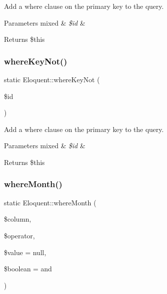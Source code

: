 Add a where clause on the primary key to the query.


\begin{DoxyParams}[1]{Parameters}
mixed & {\em \$id} & \\
\hline
\end{DoxyParams}
\begin{DoxyReturn}{Returns}
\$this 
\end{DoxyReturn}
\mbox{\label{class_eloquent_aa270e04797f3bcd3e062ddbcbb9df59a}} 
\subsubsection{\texorpdfstring{where\+Key\+Not()}{whereKeyNot()}}
{\footnotesize\ttfamily static Eloquent\+::where\+Key\+Not (\begin{DoxyParamCaption}\item[{}]{\$id }\end{DoxyParamCaption})\hspace{0.3cm}{\ttfamily [static]}}

Add a where clause on the primary key to the query.


\begin{DoxyParams}[1]{Parameters}
mixed & {\em \$id} & \\
\hline
\end{DoxyParams}
\begin{DoxyReturn}{Returns}
\$this 
\end{DoxyReturn}
\mbox{\label{class_eloquent_a530752faf5aed57517a152e74eceffd3}} 
\subsubsection{\texorpdfstring{where\+Month()}{whereMonth()}}
{\footnotesize\ttfamily static Eloquent\+::where\+Month (\begin{DoxyParamCaption}\item[{}]{\$column,  }\item[{}]{\$operator,  }\item[{}]{\$value = {\ttfamily null},  }\item[{}]{\$boolean = {\ttfamily \textquotesingle{}and\textquotesingle{}} }\end{DoxyParamCaption})\hspace{0.3cm}{\ttfamily [static]}}

